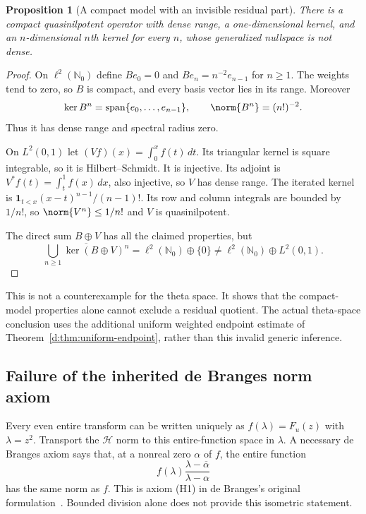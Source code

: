 \documentclass[11pt,a4paper]{article}
\numberwithin{equation}{section}
\newtheorem{proposition}[theorem]{Proposition}
\theoremstyle{definition}\newtheorem{definition}[theorem]{Definition}
\theoremstyle{remark}\newtheorem{remark}[theorem]{Remark}
\newcommand{\Hh}{\mathcal H}\newcommand{\Hw}{\mathcal H}
\begin{document}
\begin{proposition}[A compact model with an invisible residual part]\label{d:prop:countermodel}
There is a compact quasinilpotent operator with dense range, a one-dimensional kernel, and an $n$-dimensional $n$th kernel for every $n$, whose generalized nullspace is not dense.
\end{proposition}
\begin{proof}
On $\ell^2(\mathbb N_0)$ define $Be_0=0$ and $Be_n=n^{-2}e_{n-1}$ for $n\ge1$. The weights tend to zero, so $B$ is compact, and every basis vector lies in its range. Moreover
\[
 \ker B^n=\operatorname{span}\{e_0,\ldots,e_{n-1}\},\qquad
 \norm{B^n}=(n!)^{-2}.
\]
Thus it has dense range and spectral radius zero.

On $L^2(0,1)$ let $(Vf)(x)=\int_0^x f(t)\,dt$. Its triangular kernel is square integrable, so it is Hilbert--Schmidt. It is injective. Its adjoint is $V^*f(t)=\int_t^1f(x)\,dx$, also injective, so $V$ has dense range. The iterated kernel is
$\boldsymbol1_{t<x}(x-t)^{n-1}/(n-1)!$. Its row and column integrals are bounded by $1/n!$, so $\norm{V^n}\le1/n!$ and $V$ is quasinilpotent.

The direct sum $B\oplus V$ has all the claimed properties, but
\[
 \overline{\bigcup_{n\ge1}\ker(B\oplus V)^n}
 =\ell^2(\mathbb N_0)\oplus\{0\}
 \ne\ell^2(\mathbb N_0)\oplus L^2(0,1).
\]
\end{proof}

This is not a counterexample for the theta space. It shows that the compact-model properties alone cannot exclude a residual quotient. The actual theta-space conclusion uses the additional uniform weighted endpoint estimate of Theorem~\ref{d:thm:uniform-endpoint}, rather than this invalid generic inference.

\subsection{Failure of the inherited de Branges norm axiom}\label{d:sec:debranges}

Every even entire transform can be written uniquely as $f(\lambda)=F_u(z)$ with $\lambda=z^2$. Transport the $\Hh$ norm to this entire-function space in $\lambda$. A necessary de Branges axiom says that, at a nonreal zero $\alpha$ of $f$, the entire function
\begin{equation}\label{d:eq:zero-flip}
 f(\lambda)\frac{\lambda-\overline\alpha}{\lambda-\alpha}
\end{equation}
has the same norm as $f$. This is axiom (H1) in de Branges's original formulation~\cite{deBranges1961}. Bounded division alone does not provide this isometric statement.
\end{document}
